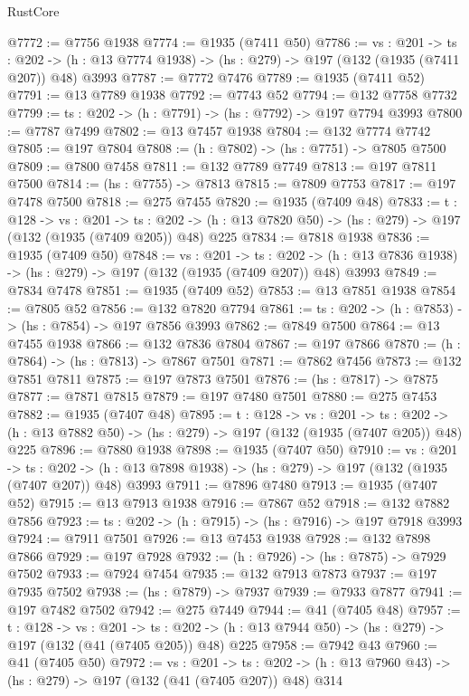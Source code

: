 \begin{lexlean}{RustCore}
\begin{coremodule}
@7772 := @7756 @1938
@7774 := @1935 (@7411 @50)
@7786 := {vs : @201} ->
  {ts : @202} -> (h : @13 @7774 @1938) -> (hs : @279) -> @197 (@132 (@1935 (@7411 @207)) @48) @3993
@7787 := @7772 @7476
@7789 := @1935 (@7411 @52)
@7791 := @13 @7789 @1938
@7792 := @7743 @52
@7794 := @132 @7758 @7732
@7799 := {ts : @202} -> (h : @7791) -> (hs : @7792) -> @197 @7794 @3993
@7800 := @7787 @7499
@7802 := @13 @7457 @1938
@7804 := @132 @7774 @7742
@7805 := @197 @7804
@7808 := (h : @7802) -> (hs : @7751) -> @7805 @7500
@7809 := @7800 @7458
@7811 := @132 @7789 @7749
@7813 := @197 @7811 @7500
@7814 := (hs : @7755) -> @7813
@7815 := @7809 @7753
@7817 := @197 @7478 @7500
@7818 := @275 @7455
@7820 := @1935 (@7409 @48)
@7833 := {t : @128} ->
  {vs : @201} ->
  {ts : @202} -> (h : @13 @7820 @50) -> (hs : @279) -> @197 (@132 (@1935 (@7409 @205)) @48) @225
@7834 := @7818 @1938
@7836 := @1935 (@7409 @50)
@7848 := {vs : @201} ->
  {ts : @202} -> (h : @13 @7836 @1938) -> (hs : @279) -> @197 (@132 (@1935 (@7409 @207)) @48) @3993
@7849 := @7834 @7478
@7851 := @1935 (@7409 @52)
@7853 := @13 @7851 @1938
@7854 := @7805 @52
@7856 := @132 @7820 @7794
@7861 := {ts : @202} -> (h : @7853) -> (hs : @7854) -> @197 @7856 @3993
@7862 := @7849 @7500
@7864 := @13 @7455 @1938
@7866 := @132 @7836 @7804
@7867 := @197 @7866
@7870 := (h : @7864) -> (hs : @7813) -> @7867 @7501
@7871 := @7862 @7456
@7873 := @132 @7851 @7811
@7875 := @197 @7873 @7501
@7876 := (hs : @7817) -> @7875
@7877 := @7871 @7815
@7879 := @197 @7480 @7501
@7880 := @275 @7453
@7882 := @1935 (@7407 @48)
@7895 := {t : @128} ->
  {vs : @201} ->
  {ts : @202} -> (h : @13 @7882 @50) -> (hs : @279) -> @197 (@132 (@1935 (@7407 @205)) @48) @225
@7896 := @7880 @1938
@7898 := @1935 (@7407 @50)
@7910 := {vs : @201} ->
  {ts : @202} -> (h : @13 @7898 @1938) -> (hs : @279) -> @197 (@132 (@1935 (@7407 @207)) @48) @3993
@7911 := @7896 @7480
@7913 := @1935 (@7407 @52)
@7915 := @13 @7913 @1938
@7916 := @7867 @52
@7918 := @132 @7882 @7856
@7923 := {ts : @202} -> (h : @7915) -> (hs : @7916) -> @197 @7918 @3993
@7924 := @7911 @7501
@7926 := @13 @7453 @1938
@7928 := @132 @7898 @7866
@7929 := @197 @7928
@7932 := (h : @7926) -> (hs : @7875) -> @7929 @7502
@7933 := @7924 @7454
@7935 := @132 @7913 @7873
@7937 := @197 @7935 @7502
@7938 := (hs : @7879) -> @7937
@7939 := @7933 @7877
@7941 := @197 @7482 @7502
@7942 := @275 @7449
@7944 := @41 (@7405 @48)
@7957 := {t : @128} ->
  {vs : @201} ->
  {ts : @202} -> (h : @13 @7944 @50) -> (hs : @279) -> @197 (@132 (@41 (@7405 @205)) @48) @225
@7958 := @7942 @43
@7960 := @41 (@7405 @50)
@7972 := {vs : @201} ->
  {ts : @202} -> (h : @13 @7960 @43) -> (hs : @279) -> @197 (@132 (@41 (@7405 @207)) @48) @314

\end{coremodule}
\end{lexlean}
